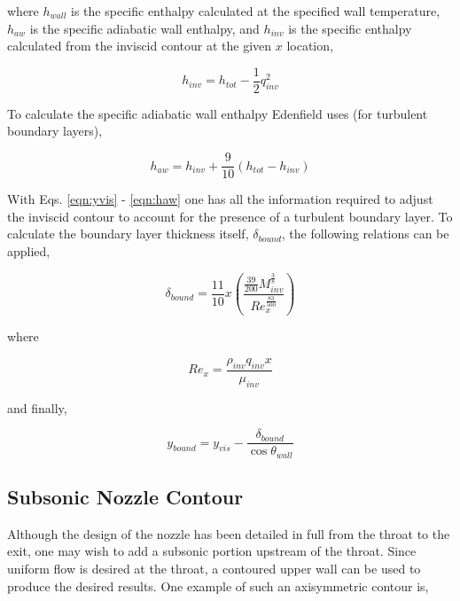 	where $h_{wall}$ is the specific enthalpy calculated at the specified wall temperature, $h_{aw}$ is
the specific adiabatic wall enthalpy, and $h_{inv}$ is the specific enthalpy calculated from the
inviscid contour at the given $x$ location,

\begin{equation}
	h_{inv}=h_{tot} - \frac{1}{2}q_{inv}^2
\label{eqn:hinv}
\end{equation}

	To calculate the specific adiabatic wall enthalpy Edenfield uses (for turbulent boundary layers),

\begin{equation}
	h_{aw} = h_{inv} + \frac{9}{10}(h_{tot} - h_{inv})
\label{eqn:haw}
\end{equation}

	With Eqs. \ref{eqn:yvis} - \ref{eqn:haw} one has all the information required to adjust the
inviscid contour to account for the presence of a turbulent boundary layer.  To calculate the boundary
layer thickness itself, $\delta_{bound}$, the following relations can be applied,

\begin{equation}
	\delta_{bound}=\frac{11}{10}x(\frac{\frac{39}{200}M_{inv}^{\frac{3}{8}}}{Re_{x}^{\frac{83}{500}}})
\label{eqn:deltab}
\end{equation}

	where 

\begin{equation}
	Re_x=\frac{\rho_{inv}q_{inv}x}{\mu_{inv}}
\label{eqn:reyx}
\end{equation}

	and finally,

\begin{equation}
	y_{bound}=y_{vis} - \frac{\delta_{bound}}{\cos\theta_{wall}}
\label{eqn:ybound}
\end{equation}

\subsection{Subsonic Nozzle Contour}

	Although the design of the nozzle has been detailed in full from the throat to 
the exit, one may wish to add a subsonic portion upstream of the throat.  Since uniform
flow is desired at the throat, a contoured upper wall can be used to
produce the desired results.  One example of such an axisymmetric contour is,

